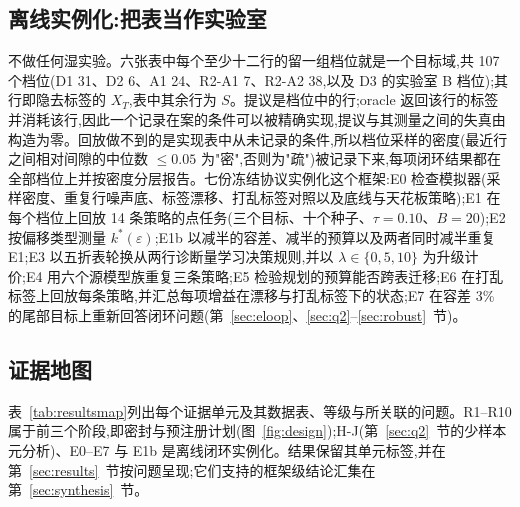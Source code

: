 \documentclass[11pt,a4paper]{ctexart}
\begin{document}
\subsection{离线实例化:把表当作实验室}
\label{sec:fw-offline}
不做任何湿实验。六张表中每个至少十二行的留一组档位就是一个目标域,共 107 个档位(D1 31、D2 6、A1 24、R2-A1 7、R2-A2 38,以及 D3 的实验室 B 档位);其行即隐去标签的 $X_T$,表中其余行为 $S$。提议是档位中的行;oracle 返回该行的标签并消耗该行,因此一个记录在案的条件可以被精确实现,提议与其测量之间的失真由构造为零。回放做不到的是实现表中从未记录的条件,所以档位采样的密度(最近行之间相对间隙的中位数 $\le 0.05$ 为"密",否则为"疏")被记录下来,每项闭环结果都在全部档位上并按密度分层报告。七份冻结协议实例化这个框架:E0 检查模拟器(采样密度、重复行噪声底、标签漂移、打乱标签对照以及底线与天花板策略);E1 在每个档位上回放 14 条策略的点任务(三个目标、十个种子、$\tau = 0.10$、$B = 20$);E2 按偏移类型测量 $k^{*}(\varepsilon)$;E1b 以减半的容差、减半的预算以及两者同时减半重复 E1;E3 以五折表轮换从两行诊断量学习决策规则,并以 $\lambda \in \{0, 5, 10\}$ 为升级计价;E4 用六个源模型族重复三条策略;E5 检验规划的预算能否跨表迁移;E6 在打乱标签上回放每条策略,并汇总每项增益在漂移与打乱标签下的状态;E7 在容差 3\% 的尾部目标上重新回答闭环问题(第~\ref{sec:eloop}、\ref{sec:q2}--\ref{sec:robust}~节)。

\subsection{证据地图}
\label{sec:fw-map}
表~\ref{tab:resultsmap}列出每个证据单元及其数据表、等级与所关联的问题。R1--R10 属于前三个阶段,即密封与预注册计划(图~\ref{fig:design});H-J(第~\ref{sec:q2}~节的少样本元分析)、E0--E7 与 E1b 是离线闭环实例化。结果保留其单元标签,并在第~\ref{sec:results}~节按问题呈现;它们支持的框架级结论汇集在第~\ref{sec:synthesis}~节。
\end{document}
